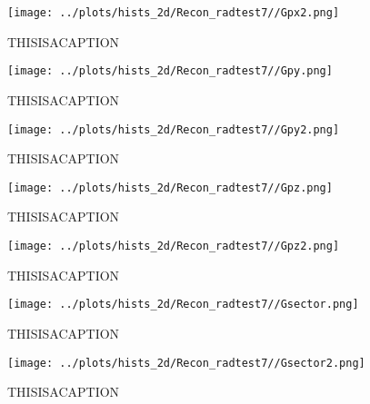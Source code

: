 \documentclass{article}
\begin{document}
\begin{landscape}
    \begin{figure}[ht]
        \centering

        \texttt{[image: ../plots/hists\_2d/Recon\_radtest7//Gpx2.png]}
        \captionsetup{textformat=empty,labelformat=blank}
        \caption{THISISACAPTION}
    \end{figure}
    \clearpage
    
    \begin{figure}[ht]
        \centering

        \texttt{[image: ../plots/hists\_2d/Recon\_radtest7//Gpy.png]}
        \captionsetup{textformat=empty,labelformat=blank}
        \caption{THISISACAPTION}
    \end{figure}
    \clearpage
    
    \begin{figure}[ht]
        \centering

        \texttt{[image: ../plots/hists\_2d/Recon\_radtest7//Gpy2.png]}
        \captionsetup{textformat=empty,labelformat=blank}
        \caption{THISISACAPTION}
    \end{figure}
    \clearpage
    
    \begin{figure}[ht]
        \centering

        \texttt{[image: ../plots/hists\_2d/Recon\_radtest7//Gpz.png]}
        \captionsetup{textformat=empty,labelformat=blank}
        \caption{THISISACAPTION}
    \end{figure}
    \clearpage
    
    \begin{figure}[ht]
        \centering

        \texttt{[image: ../plots/hists\_2d/Recon\_radtest7//Gpz2.png]}
        \captionsetup{textformat=empty,labelformat=blank}
        \caption{THISISACAPTION}
    \end{figure}
    \clearpage
    
    \begin{figure}[ht]
        \centering

        \texttt{[image: ../plots/hists\_2d/Recon\_radtest7//Gsector.png]}
        \captionsetup{textformat=empty,labelformat=blank}
        \caption{THISISACAPTION}
    \end{figure}
    \clearpage
    
    \begin{figure}[ht]
        \centering

        \texttt{[image: ../plots/hists\_2d/Recon\_radtest7//Gsector2.png]}
        \captionsetup{textformat=empty,labelformat=blank}
        \caption{THISISACAPTION}
    \end{figure}
    \clearpage
    

\end{landscape}
\end{document}
